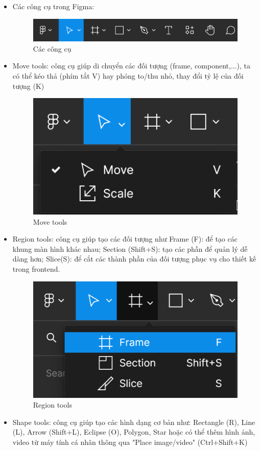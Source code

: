 \documentclass[11pt]{article}
\begin{document}
\begin{itemize}
    \item Các công cụ trong Figma:
          \begin{figure}[!h]
              \centering
              \includegraphics[width=1\linewidth]{imgs/img (3).png}
              \caption{Các công cụ}
          \end{figure}
          \newpage
    \item Move tools: công cụ giúp di chuyển các đối tượng (frame, component,...), ta có thể kéo thả (phím tắt V) hay phóng to/thu nhỏ, thay đổi tỷ lệ của đối tượng (K)
          \begin{figure}[!h]
              \centering
              \includegraphics[width=0.5\linewidth]{imgs/img (4).png}
              \caption{Move tools}
          \end{figure}
    \item Region tools: công cụ giúp tạo các đối tượng như  Frame (F): để tạo các khung màn hình khác nhau; Section (Shift+S): tạo các phần để quản lý dễ dàng hơn; Slice(S): để cắt các thành phần của đối tượng phục vụ cho thiết kế trong frontend.

          \begin{figure}[!h]
              \centering
              \includegraphics[width=0.5\linewidth]{imgs/img (5).png}
              \caption{Region tools}
          \end{figure}
          \newpage
    \item Shape tools: công cụ giúp tạo các hình dạng cơ bản như: Rectangle (R), Line (L), Arrow (Shift+L), Eclipse (O), Polygon, Star hoặc có thể thêm hình ảnh, video từ máy tính cá nhân thông qua "Place image/video" (Ctrl+Shift+K) 


\end{itemize}
\end{document}
